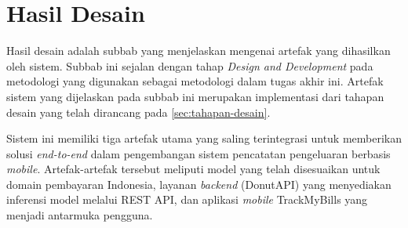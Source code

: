 \section{Hasil Desain}
\label{sec:hasil-desain}

Hasil desain adalah subbab yang menjelaskan mengenai artefak yang dihasilkan oleh sistem. Subbab ini sejalan dengan tahap \emph{Design and Development} pada metodologi \dsrm{} yang digunakan sebagai metodologi dalam tugas akhir ini. Artefak sistem yang dijelaskan pada subbab ini merupakan implementasi dari tahapan desain yang telah dirancang pada \autoref{sec:tahapan-desain}. 

Sistem ini memiliki tiga artefak utama yang saling terintegrasi untuk memberikan solusi \emph{end-to-end} dalam pengembangan sistem pencatatan pengeluaran berbasis \emph{mobile}. Artefak-artefak tersebut meliputi model \donut{} yang telah disesuaikan untuk domain pembayaran Indonesia, layanan \emph{backend} (DonutAPI) yang menyediakan inferensi model melalui REST API, dan aplikasi \emph{mobile} TrackMyBills yang menjadi antarmuka pengguna.







